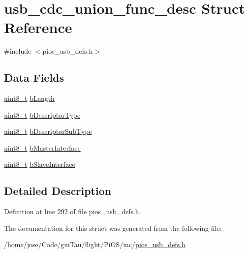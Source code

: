 \hypertarget{structusb__cdc__union__func__desc}{\section{usb\-\_\-cdc\-\_\-union\-\_\-func\-\_\-desc Struct Reference}
\label{structusb__cdc__union__func__desc}
}


{\ttfamily \#include $<$pios\-\_\-usb\-\_\-defs.\-h$>$}

\subsection*{Data Fields}
\begin{DoxyCompactItemize}
\item 
\hyperlink{stdint_8h_aba7bc1797add20fe3efdf37ced1182c5}{uint8\-\_\-t} \hyperlink{group___p_i_o_s___u_s_b___d_e_f_s_ga2175f86e94200d579781fa41c37c9bc1}{b\-Length}
\item 
\hyperlink{stdint_8h_aba7bc1797add20fe3efdf37ced1182c5}{uint8\-\_\-t} \hyperlink{group___p_i_o_s___u_s_b___d_e_f_s_ga1f7c70ea92f6b53756b96cb3b3d791c6}{b\-Descriptor\-Type}
\item 
\hyperlink{stdint_8h_aba7bc1797add20fe3efdf37ced1182c5}{uint8\-\_\-t} \hyperlink{group___p_i_o_s___u_s_b___d_e_f_s_ga5784c9fea0c30db9be3ed5d38e02c4b7}{b\-Descriptor\-Sub\-Type}
\item 
\hyperlink{stdint_8h_aba7bc1797add20fe3efdf37ced1182c5}{uint8\-\_\-t} \hyperlink{group___p_i_o_s___u_s_b___d_e_f_s_ga9194ac785cd0cc798e0a438dbcab9062}{b\-Master\-Interface}
\item 
\hyperlink{stdint_8h_aba7bc1797add20fe3efdf37ced1182c5}{uint8\-\_\-t} \hyperlink{group___p_i_o_s___u_s_b___d_e_f_s_ga9cfe098c280a95412143266a948eb290}{b\-Slave\-Interface}
\end{DoxyCompactItemize}


\subsection{Detailed Description}


Definition at line 292 of file pios\-\_\-usb\-\_\-defs.\-h.



The documentation for this struct was generated from the following file\-:\begin{DoxyCompactItemize}
\item 
/home/jose/\-Code/gui\-Tau/flight/\-Pi\-O\-S/inc/\hyperlink{pios__usb__defs_8h}{pios\-\_\-usb\-\_\-defs.\-h}\end{DoxyCompactItemize}
